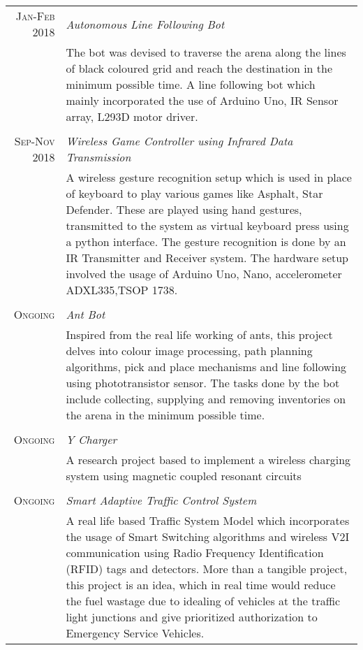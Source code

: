 \documentclass[10pt]{article} %
\begin{document}
\begin{tabular}{r|p{12cm}} %
 \textsc{Jan-Feb 2018} & \emph{Autonomous Line Following Bot}\\&{The bot was devised to traverse the arena along the lines of black coloured grid and reach the destination in the minimum possible time. A line following bot which mainly incorporated the use of Arduino Uno, IR Sensor array, L293D motor driver. }\\\multicolumn{2}{c}{} \\
 \textsc{Sep-Nov 2018} & \emph{Wireless Game Controller using Infrared Data Transmission}\\&{A wireless gesture recognition setup which is used in place of keyboard to play various games like Asphalt, Star Defender. These are played using hand gestures, transmitted to the system as virtual keyboard press using a python interface. The gesture recognition is done by an IR Transmitter and Receiver system. The hardware setup involved the usage of Arduino Uno, Nano, accelerometer ADXL335,TSOP 1738. }\\\multicolumn{2}{c}{} \\
\textsc{Ongoing} & \emph{Ant Bot}\\&{Inspired from the real life working of ants, this project delves into colour image processing, path planning algorithms, pick and place mechanisms and line following using phototransistor sensor. The tasks done by the bot include collecting, supplying and removing inventories on the arena in the minimum possible time.  }\\\multicolumn{2}{c}{} \\
\textsc{Ongoing} & \emph{Y Charger}\\&{A research project based to implement a wireless charging system using magnetic coupled resonant circuits }\\\multicolumn{2}{c}{} \\
\textsc{Ongoing} & \emph{Smart Adaptive Traffic Control System}\\&{A real life based Traffic System Model which incorporates the usage of Smart Switching algorithms and wireless V2I communication using Radio Frequency Identification (RFID) tags and detectors. More than a tangible project, this project is an idea, which in real time would reduce the fuel wastage due to idealing of vehicles at the traffic light junctions and give prioritized authorization to Emergency Service Vehicles.}
\end{tabular}
\end{document}
